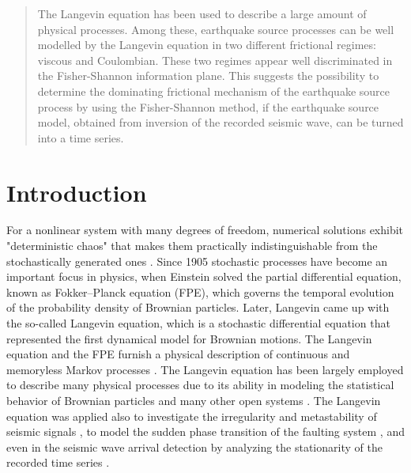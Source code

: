 \documentclass[%
 aip,
rsi,%
 amsmath,amssymb,
 reprint,%
]{revtex4-1}
\begin{document}
\begin{quotation}
    The Langevin equation has been used to describe a large amount of  physical processes. Among these, earthquake source processes can be well modelled by the Langevin equation in two different frictional regimes: viscous and Coulombian. These two regimes appear well discriminated in the Fisher-Shannon information plane. This suggests the possibility to determine the dominating frictional mechanism of the earthquake source process by using the Fisher-Shannon method, if the earthquake source model,  obtained from inversion of the recorded seismic wave, can be turned into a time series.
\end{quotation}

\section{\label{sec:intro}Introduction}
For a nonlinear system with many degrees of freedom, numerical solutions exhibit "deterministic chaos" that makes them practically indistinguishable from the stochastically generated ones \cite{selvam_universal_2000,cattani_deterministic_2017,cecconi_brownian_2005,eckmann_roads_1981,rundle_statistical_2003}. Since 1905 stochastic processes have become an important focus in physics, when Einstein solved the partial differential equation, known as Fokker--Planck equation (FPE), which governs the temporal evolution of the probability density of Brownian particles.
Later, Langevin came up with the so-called Langevin equation, which is a stochastic differential equation that represented the first dynamical model for Brownian motions\cite{coffey_langevin_2012}.
The Langevin equation and the FPE furnish a physical description  of continuous and memoryless Markov processes \cite{lemons_paul_1997,renn_einsteins_2005}.
The Langevin equation has been largely employed to describe many physical processes due to its ability in modeling the statistical behavior of Brownian particles and many other open systems \cite{yulmetyev_study_2009,eslamizadeh_statistical_2018}.
The Langevin equation was applied also to investigate the irregularity and metastability of seismic signals \cite{yulmetyev_study_2009}, to model the sudden phase transition of the faulting system \cite{rundle_dynamics_1996}, and even in the seismic wave arrival detection by analyzing the stationarity of the recorded time series \cite{nakamula_automatic_2007}.
\end{document}
